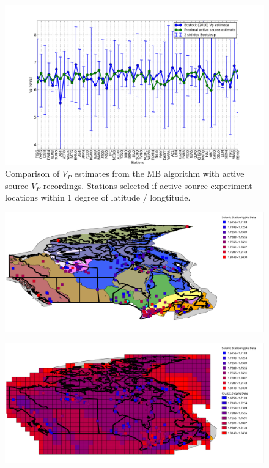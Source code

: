 \documentclass[draft, 12pt]{article}
\begin{document}
\begin{figure}
  \centering
  \includegraphics[width=\textwidth]{activeSourceComparison}
  \caption{Comparison of $V_P$ estimates from the MB algorithm with active source $V_P$ recordings. Stations selected if active source experiment locations within 1 degree of latitude / longtitude.}
  \label{fig:activeComp}
\end{figure}

\begin{figure}
  \centering
  \includegraphics[width=\textwidth]{VpVsMap}
  \caption{}
  \label{fig:VpVsMap}
\end{figure}

\begin{figure}
  \centering
  \includegraphics[width=\textwidth]{VpVsMapCrust}
  \caption{}
  \label{fig:VpVsMapCrust}
\end{figure}
\end{document}
